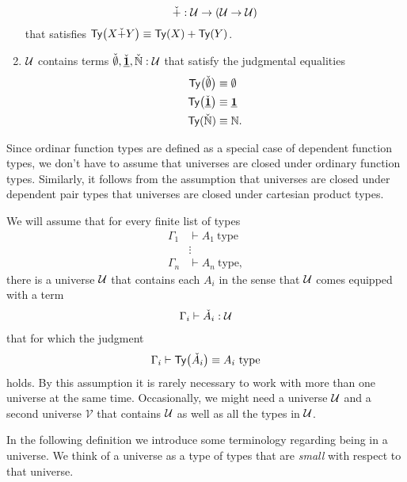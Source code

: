 \begin{defn}
\begin{enumerate}
    \begin{equation*}
      \check{+}:\mathcal{U}\to (\mathcal{U}\to\mathcal{U})
    \end{equation*}
    that satisfies $\mathsf{Ty}\big(X\check{+}Y\big)\equiv \mathsf{Ty}(X)+\mathsf{Ty}(Y)$.
  \item $\mathcal{U}$ contains terms $\check{\emptyset},\check{\underline{\mathbf{1}}},\check{{\mathbb{N}}}:\mathcal{U}$
    that satisfy the judgmental equalities
    \begin{align*}
      \mathsf{Ty}\big(\check{\emptyset}\big) & \equiv \emptyset \\
      \mathsf{Ty}\big(\check{\underline{\mathbf{1}}}\big) & \equiv \underline{\mathbf{1}} \\
      \mathsf{Ty}(\check{{\mathbb{N}}}) & \equiv {\mathbb{N}}.
    \end{align*}
  \end{enumerate}
\end{defn}

\begin{rmk}
  Since ordinar function types are defined as a special case of dependent function types, we don't have to assume that universes are closed under ordinary function types. Similarly, it follows from the assumption that universes are closed under dependent pair types that universes are closed under cartesian product types.
\end{rmk}

\begin{rmk}
We will assume that for every finite list of types
\begin{align*}
  \Gamma_1 & \vdash A_1~\mathrm{type} \\
  & \vdots \\
  \Gamma_n & \vdash A_n~\mathrm{type},
\end{align*}
there is a universe $\mathcal{U}$ that contains each $A_i$ in the sense that $\mathcal{U}$ comes equipped with a term
\begin{align*}
  \Gamma_i\vdash \check{A}_i:\mathcal{U}
\end{align*}
that for which the judgment
\begin{equation*}
  \Gamma_i\vdash \mathsf{Ty}\big(\check{A}_i\big)\equiv A_i~\mathrm{type}
\end{equation*}
holds. By this assumption it is rarely necessary to work with more than one universe at the same time. Occasionally, we might need a universe $\mathcal{U}$ and a second universe $\mathcal{V}$ that contains $\mathcal{U}$ as well as all the types in $\mathcal{U}$.
\end{rmk}

In the following definition we introduce some terminology regarding being in a universe. We think of a universe as a type of types that are \emph{small} with respect to that universe.

